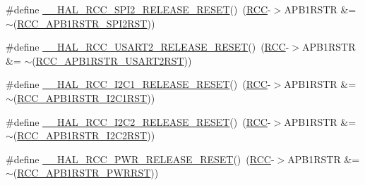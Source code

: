 \begin{DoxyCompactItemize}
\item 
\#define \hyperlink{group___r_c_c___a_p_b1___force___release___reset_gacb910fd0c3c5a27d020ef3df20fce4c7}{\+\_\+\+\_\+\+H\+A\+L\+\_\+\+R\+C\+C\+\_\+\+S\+P\+I2\+\_\+\+R\+E\+L\+E\+A\+S\+E\+\_\+\+R\+E\+S\+ET}()~(\hyperlink{group___peripheral__declaration_ga74944438a086975793d26ae48d5882d4}{R\+CC}-\/$>$A\+P\+B1\+R\+S\+TR \&= $\sim$(\hyperlink{group___peripheral___registers___bits___definition_ga0a6289a35547cf0d5300706f9baa18ea}{R\+C\+C\+\_\+\+A\+P\+B1\+R\+S\+T\+R\+\_\+\+S\+P\+I2\+R\+ST}))
\item 
\#define \hyperlink{group___r_c_c___a_p_b1___force___release___reset_ga8baebf28a2739de5f3c5ef72519b9499}{\+\_\+\+\_\+\+H\+A\+L\+\_\+\+R\+C\+C\+\_\+\+U\+S\+A\+R\+T2\+\_\+\+R\+E\+L\+E\+A\+S\+E\+\_\+\+R\+E\+S\+ET}()~(\hyperlink{group___peripheral__declaration_ga74944438a086975793d26ae48d5882d4}{R\+CC}-\/$>$A\+P\+B1\+R\+S\+TR \&= $\sim$(\hyperlink{group___peripheral___registers___bits___definition_ga195c39f08384ca1fa13b53a31d65d0a5}{R\+C\+C\+\_\+\+A\+P\+B1\+R\+S\+T\+R\+\_\+\+U\+S\+A\+R\+T2\+R\+ST}))
\item 
\#define \hyperlink{group___r_c_c___a_p_b1___force___release___reset_ga87cc8c2107c1d0820cc1f7e2aeb1aeb9}{\+\_\+\+\_\+\+H\+A\+L\+\_\+\+R\+C\+C\+\_\+\+I2\+C1\+\_\+\+R\+E\+L\+E\+A\+S\+E\+\_\+\+R\+E\+S\+ET}()~(\hyperlink{group___peripheral__declaration_ga74944438a086975793d26ae48d5882d4}{R\+CC}-\/$>$A\+P\+B1\+R\+S\+TR \&= $\sim$(\hyperlink{group___peripheral___registers___bits___definition_gadcd25346a7d7b0009090adfbca899b93}{R\+C\+C\+\_\+\+A\+P\+B1\+R\+S\+T\+R\+\_\+\+I2\+C1\+R\+ST}))
\item 
\#define \hyperlink{group___r_c_c___a_p_b1___force___release___reset_ga2fa8cc909b285813af86c253ec110356}{\+\_\+\+\_\+\+H\+A\+L\+\_\+\+R\+C\+C\+\_\+\+I2\+C2\+\_\+\+R\+E\+L\+E\+A\+S\+E\+\_\+\+R\+E\+S\+ET}()~(\hyperlink{group___peripheral__declaration_ga74944438a086975793d26ae48d5882d4}{R\+CC}-\/$>$A\+P\+B1\+R\+S\+TR \&= $\sim$(\hyperlink{group___peripheral___registers___bits___definition_ga412d59407e5dad43cf8ae1ea6f8bc5c3}{R\+C\+C\+\_\+\+A\+P\+B1\+R\+S\+T\+R\+\_\+\+I2\+C2\+R\+ST}))
\item 
\#define \hyperlink{group___r_c_c___a_p_b1___force___release___reset_gaaa5a340d38d50e508243f48bbb47dd32}{\+\_\+\+\_\+\+H\+A\+L\+\_\+\+R\+C\+C\+\_\+\+P\+W\+R\+\_\+\+R\+E\+L\+E\+A\+S\+E\+\_\+\+R\+E\+S\+ET}()~(\hyperlink{group___peripheral__declaration_ga74944438a086975793d26ae48d5882d4}{R\+CC}-\/$>$A\+P\+B1\+R\+S\+TR \&= $\sim$(\hyperlink{group___peripheral___registers___bits___definition_ga274d8cb48f0e89831efabea66d64af2a}{R\+C\+C\+\_\+\+A\+P\+B1\+R\+S\+T\+R\+\_\+\+P\+W\+R\+R\+ST}))
\end{DoxyCompactItemize}


